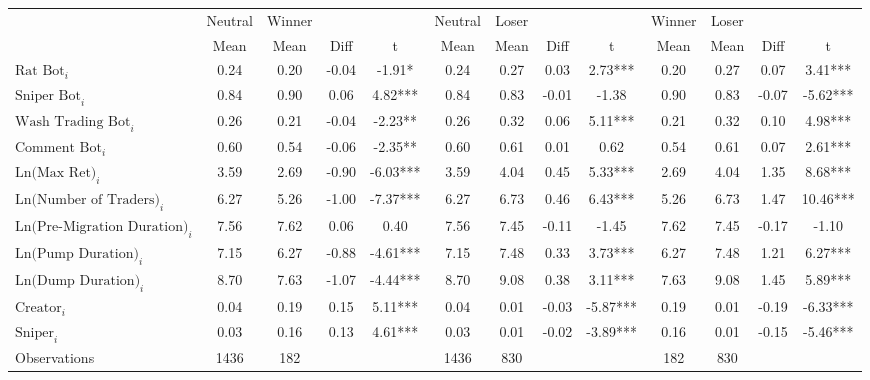 \begin{tabular}{lcccccccccccc}
\hline
& Neutral & Winner & & & Neutral & Loser & & & Winner & Loser & & \\
\cline{2-13}
& Mean & Mean & Diff & t & Mean & Mean & Diff & t & Mean & Mean & Diff & t \\
\hline
$\text{Rat Bot}_{i}$ & 0.24 & 0.20 & -0.04 & -1.91* & 0.24 & 0.27 & 0.03 & 2.73*** & 0.20 & 0.27 & 0.07 & 3.41*** \\
$\text{Sniper Bot}_{i}$ & 0.84 & 0.90 & 0.06 & 4.82*** & 0.84 & 0.83 & -0.01 & -1.38 & 0.90 & 0.83 & -0.07 & -5.62*** \\
$\text{Wash Trading Bot}_{i}$ & 0.26 & 0.21 & -0.04 & -2.23** & 0.26 & 0.32 & 0.06 & 5.11*** & 0.21 & 0.32 & 0.10 & 4.98*** \\
$\text{Comment Bot}_{i}$ & 0.60 & 0.54 & -0.06 & -2.35** & 0.60 & 0.61 & 0.01 & 0.62 & 0.54 & 0.61 & 0.07 & 2.61*** \\
$\text{Ln(Max Ret)}_{i}$ & 3.59 & 2.69 & -0.90 & -6.03*** & 3.59 & 4.04 & 0.45 & 5.33*** & 2.69 & 4.04 & 1.35 & 8.68*** \\
$\text{Ln(Number of Traders)}_{i}$ & 6.27 & 5.26 & -1.00 & -7.37*** & 6.27 & 6.73 & 0.46 & 6.43*** & 5.26 & 6.73 & 1.47 & 10.46*** \\
$\text{Ln(Pre-Migration Duration)}_{i}$ & 7.56 & 7.62 & 0.06 & 0.40 & 7.56 & 7.45 & -0.11 & -1.45 & 7.62 & 7.45 & -0.17 & -1.10 \\
$\text{Ln(Pump Duration)}_{i}$ & 7.15 & 6.27 & -0.88 & -4.61*** & 7.15 & 7.48 & 0.33 & 3.73*** & 6.27 & 7.48 & 1.21 & 6.27*** \\
$\text{Ln(Dump Duration)}_{i}$ & 8.70 & 7.63 & -1.07 & -4.44*** & 8.70 & 9.08 & 0.38 & 3.11*** & 7.63 & 9.08 & 1.45 & 5.89*** \\
$\text{Creator}_{i}$ & 0.04 & 0.19 & 0.15 & 5.11*** & 0.04 & 0.01 & -0.03 & -5.87*** & 0.19 & 0.01 & -0.19 & -6.33*** \\
$\text{Sniper}_{i}$ & 0.03 & 0.16 & 0.13 & 4.61*** & 0.03 & 0.01 & -0.02 & -3.89*** & 0.16 & 0.01 & -0.15 & -5.46*** \\
\hline
Observations & 1436 & 182 & & & 1436 & 830 & & & 182 & 830 & & \\
\hline
\end{tabular}